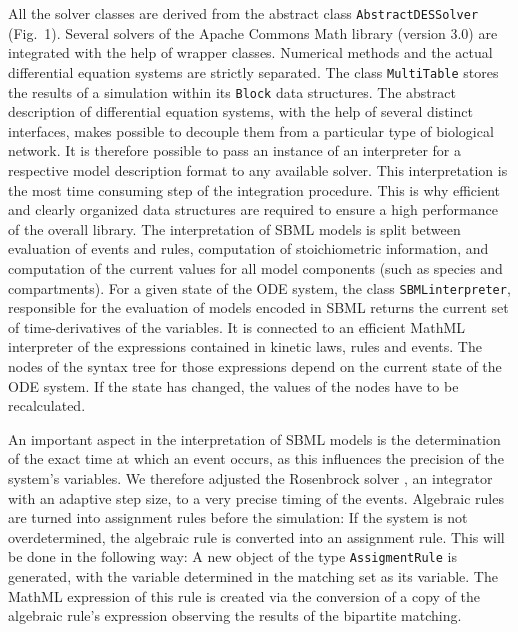 \documentclass[10pt]{bmc_article}
\newenvironment{bmcformat}{\baselineskip20pt\sloppy\setboolean{publ}{false}}{\baselineskip20pt\sloppy}
\newcommand{\AbstractDESSolver}{\texttt{Abstract\-DES\-Solver}}
\newcommand{\SBMLinterpreter}{\texttt{SBML\-interpreter}}
\newcommand{\MultiTable}{\texttt{Multi\-Table}}
\newcommand{\Block}{\texttt{Block}}
\begin{document}
\begin{bmcformat}
All the solver classes are derived from the abstract class \AbstractDESSolver{}
(Fig.~1).
Several solvers of the Apache Commons Math library (version 3.0) are integrated
with the help of wrapper classes. Numerical methods and the actual differential
equation systems are strictly separated. The class \MultiTable{} stores the
results of a simulation within its \Block{} data structures. 
%
The abstract description of differential equation systems, with the help of
several distinct interfaces, makes possible to decouple them from a particular
type of biological network. It is therefore possible to pass an instance of an
interpreter for a respective model description format to any available solver.
%
This interpretation is the most time consuming step of the integration procedure.
This is why efficient and clearly organized data structures are required to
ensure a high performance of the overall library. The interpretation of SBML
models is split between evaluation of events and rules, computation of
stoichiometric information, and computation of the current values for all model
components (such as species and compartments).
%
For a given state of the ODE system, the class \SBMLinterpreter{}, responsible
for the evaluation of models encoded in SBML returns the current set of
time-derivatives of the variables.
It is connected to an efficient MathML interpreter of the expressions contained
in kinetic laws, rules and events. The nodes of the syntax tree for those
expressions depend on the current state of the ODE system. If the state has
changed, the values of the nodes have to be recalculated.

%
An important aspect in the interpretation of SBML models is the
determination of the exact time at which an event occurs, as this influences
the precision of the system's variables. We therefore adjusted the Rosenbrock
solver \cite{Kotcon2011}, an integrator with an adaptive step size, to a very
precise timing of the events.
%
Algebraic rules are turned into assignment rules before the
simulation: If the system is not overdetermined, the algebraic rule is converted into an assignment rule.
This will be done in the following way: A new object of the type \texttt{AssigmentRule} is generated, with the variable determined in the matching set as its variable. The MathML expression of this rule is created via the conversion of a copy of the algebraic rule's expression observing the results of the bipartite matching.
%


\end{bmcformat}
\end{document}
